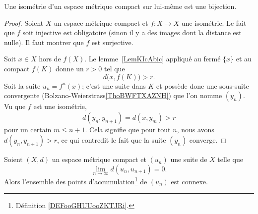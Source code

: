 \begin{proposition}
    Une isométrie d'un espace métrique compact sur lui-même est une bijection.
\end{proposition}

\begin{proof}
    Soient \( X\) un espace métrique compact et \( f\colon X\to X\) une isométrie. Le fait que \( f\) soit injective est obligatoire (sinon il y a des images dont la distance est nulle). Il faut montrer que \( f\) est surjective.

    Soit \( x\in X\) hors de \( f(X)\). Le lemme~\ref{LemKIcAbic} appliqué au fermé \( \{ x \}\) et au compact \( f(K)\) donne un \( r>0\) tel que
    \begin{equation}
        d\big( x,f(K)\big)>r.
    \end{equation}
    Soit la suite \( u_n=f^n(x)\); c'est une suite dans \( K\) et possède donc une sous-suite convergente (Bolzano-Weierstrass\ref{ThoBWFTXAZNH}) que l'on nomme \( (y_n)\). Vu que \( f\) est une isométrie,
    \begin{equation}
        d(y_{n},y_{n+1})=d(x,y_m)>r
    \end{equation}
    pour un certain \( m\leq n+1\). Cela signifie que pour tout \( n\), nous avons \( d(y_n,y_{n+1})>r\), ce qui contredit le fait que la suite \( (y_n)\) converge.
\end{proof}

\begin{proposition} \label{PropLHWACDU}
    Soient \( (X,d)\) un espace métrique compact et \( (u_n)\) une suite de \( X\) telle que
    \begin{equation}
        \lim_{n\to \infty} d(u_n,u_{n+1})=0.
    \end{equation}
    Alors l'ensemble des points d'accumulation\footnote{Définition \ref{DEFooGHUUooZKTJRi}.} de \( (u_n)\) est connexe.
\end{proposition}

